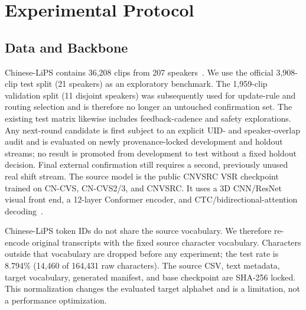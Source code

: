 \section{Experimental Protocol}
\label{sec:experiments}

\subsection{Data and Backbone}

Chinese-LiPS contains 36,208 clips from 207 speakers~\cite{zhao2025chineselips}. We use the official 3,908-clip test split (21 speakers) as an exploratory benchmark. The 1,959-clip validation split (11 disjoint speakers) was subsequently used for update-rule and routing selection and is therefore no longer an untouched confirmation set. The existing test matrix likewise includes feedback-cadence and safety explorations. Any next-round candidate is first subject to an explicit UID- and speaker-overlap audit and is evaluated on newly provenance-locked development and holdout streams; no result is promoted from development to test without a fixed holdout decision. Final external confirmation still requires a second, previously unused real shift stream. The source model is the public CNVSRC VSR checkpoint trained on CN-CVS, CN-CVS2/3, and CNVSRC. It uses a 3D CNN/ResNet visual front end, a 12-layer Conformer encoder, and CTC/bidirectional-attention decoding~\cite{cnvsrc2025baseline}.

Chinese-LiPS token IDs do not share the source vocabulary. We therefore re-encode original transcripts with the fixed source character vocabulary. Characters outside that vocabulary are dropped before any experiment; the test rate is 8.794\% (14,460 of 164,431 raw characters). The source CSV, text metadata, target vocabulary, generated manifest, and base checkpoint are SHA-256 locked. This normalization changes the evaluated target alphabet and is a limitation, not a performance optimization.

